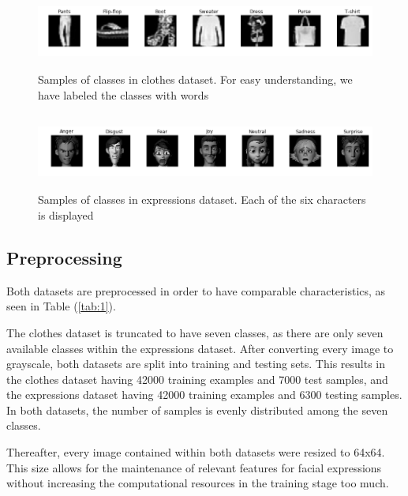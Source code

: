 \documentclass{article}
\begin{document}
\begin{figure}[tb]
    \vskip 5mm
        \begin{center}
            \includegraphics[width=\textwidth,height=2.5cm]{original_clothes}
            \caption{Samples of classes in clothes dataset. For easy understanding, we have labeled the classes with words}
            \label{fig:1}
        \end{center}
    \vskip -5mm
\end{figure}

\begin{figure}[tb]
    \vskip 5mm
        \begin{center}
            \includegraphics[width=\textwidth,height=2.5cm]{original_expressions}
            \caption{Samples of classes in expressions dataset. Each of the six characters is displayed}
            \label{fig:2}
        \end{center}
    \vskip -5mm
\end{figure}

\subsection{Preprocessing}
\label{sec:preprocessing}

Both datasets are preprocessed in order to have comparable characteristics, as seen in Table (\ref{tab:1}). 

The clothes dataset is truncated to have seven classes, as there are only seven available classes within the expressions dataset. After converting every image to grayscale, both datasets are split into training and testing sets. This results in the clothes dataset having 42000 training examples and 7000 test samples, and the expressions dataset having 42000 training examples and 6300 testing samples. In both datasets, the number of samples is evenly distributed among the seven classes.

Thereafter, every image contained within both datasets were resized to 64x64. This size allows for the maintenance of relevant features for facial expressions without increasing the computational resources in the training stage too much.
\end{document}
